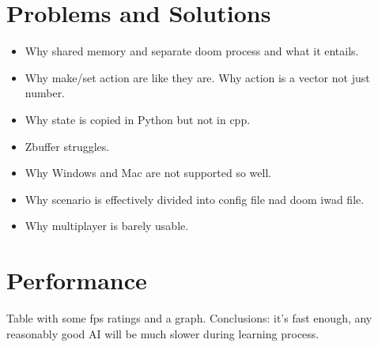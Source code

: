 \section{Problems and Solutions}
\begin{itemize}
\item Why shared memory and separate doom process and what it entails.
\item Why make/set action are like they are. Why action is a vector not just number.
\item Why state is copied in Python but not in cpp.
\item Zbuffer struggles.
\item Why Windows and Mac are not supported so well.
\item Why scenario is effectively divided into config file nad doom iwad file.
\item Why multiplayer is barely usable.
\end{itemize}

\section{Performance}
Table with some fps ratings and a graph.
Conclusions: it's fast enough, any reasonably good AI will be much slower during learning process.



